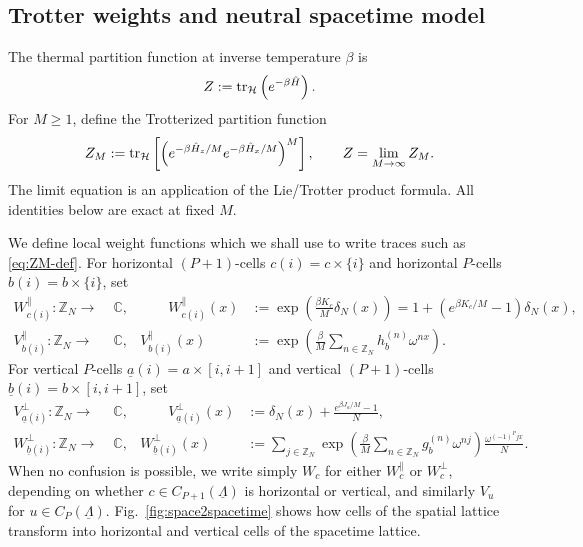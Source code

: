 \subsection{Trotter weights and neutral spacetime model}
\label{sec:trotter-weights}

The thermal partition function at inverse temperature \(\beta\) is
\begin{equation}
	Z
	:=
	\mathrm{tr}_{\mathcal H}\left(e^{-\beta\hat H}\right).
	\label{eq:Z-quantum-def}
\end{equation}
For \(M\ge1\), define the Trotterized partition function
\begin{equation}
	Z_M
	:=
	\mathrm{tr}_{\mathcal H}
	\left[
	\left(
	e^{-\beta\hat H_z/M}e^{-\beta\hat H_x/M}
	\right)^M
	\right],
	\qquad
	Z=\lim_{M\to\infty}Z_M.
	\label{eq:ZM-def}
\end{equation}
The limit equation is an application of the Lie/Trotter product formula. All identities below are exact at fixed \(M\).

We define local weight functions which we shall use to write traces such as \eqref{eq:ZM-def}. For horizontal
\((P+1)\)-cells \(c(i)=c\times\{i\}\) and horizontal \(P\)-cells \(b(i)=b\times\{i\}\), set
\begin{subequations}
	\begin{align}
		W_{c(i)}^{\parallel}:\mathbb Z_N \to&\; \mathbb C,
		&\qquad
		W_{c(i)}^{\parallel}(x)
		&:=
		\exp\left(\frac{\beta K_c}{M}\delta_N(x)\right)
		=
		1+\left(e^{\beta K_c/M}-1\right)\delta_N(x),
		\label{eq:W-parallel}
		\\
		V_{b(i)}^{\parallel}:\mathbb Z_N \to&\; \mathbb C,
		&
		V_{b(i)}^{\parallel}(x)
		&:=
		\exp\left(
		\frac{\beta}{M}
		\sum_{n\in\mathbb Z_N}h_b^{(n)}\omega^{nx}
		\right).
		\label{eq:V-parallel}
	\end{align}
	\label{eq:parallel-weights}
\end{subequations}
For vertical \(P\)-cells \(\underline a(i)=a\times[i,i+1]\) and vertical
\((P+1)\)-cells \(\underline b(i)=b\times[i,i+1]\), set
\begin{subequations}
	\begin{align}
		V_{\underline a(i)}^{\perp}:\mathbb Z_N \to&\; \mathbb C,
		&\qquad
		V_{\underline a(i)}^{\perp}(x)
		&:=
		\delta_N(x)+\frac{e^{\beta J_a/M}-1}{N},
		\label{eq:V-perp}
		\\
		W_{\underline b(i)}^{\perp}:\mathbb Z_N \to&\; \mathbb C,
		&
		W_{\underline b(i)}^{\perp}(x)
		&:=
		\sum_{j\in\mathbb Z_N}
		\exp\left(
		\frac{\beta}{M}
		\sum_{n\in\mathbb Z_N}g_b^{(n)}\omega^{nj}
		\right)
		\frac{\omega^{(-1)^Pjx}}{N}.
		\label{eq:W-perp}
	\end{align}
	\label{eq:perp-weights}
\end{subequations}
When no confusion is possible, we write simply \(W_c\) for either \(W_c^\parallel\) or
\(W_c^\perp\), depending on whether \(c\in C_{P+1}(\underline\Lambda)\) is horizontal or vertical,
and similarly \(V_u\) for \(u\in C_P(\underline\Lambda)\). Fig.~\ref{fig:space2spacetime} shows how cells of the spatial lattice transform into horizontal and vertical cells of the spacetime lattice.

